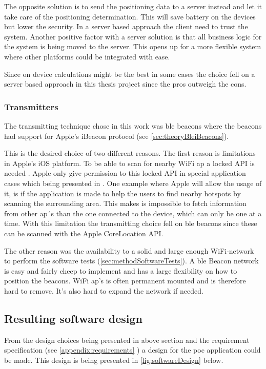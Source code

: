 \bigskip

The opposite solution is to send the positioning data to a server instead and let it take care of the positioning determination.
This will save battery on the devices but lower the security. 
In a server based approach the client need to trust the system.
Another positive factor with a server solution is that all business logic for the system is being moved to the server.
This opens up for a more flexible system where other platforms could be integrated with ease.

\bigskip

Since on device calculations might be the best in some cases the choice fell on a server based approach in this thesis project since the pros outweigh the cons.


\subsubsection{Transmitters}\label{sec:methodSoftwareDesignTransmitters}
The transmitting technique chose in this work was \acrshort{ble} beacons where the beacons had support for Apple's iBeacon protocol (see \cref{sec:theoryBleiBeacons}).

\bigskip

This is the desired choice of two different reasons.
The first reason is limitations in Apple's iOS platform.
To be able to scan for nearby WiFi \acrfull{ap} a locked API is needed \cite{NEHotspotHelperAppleDeveloper}.
Apple only give permission to this locked API in special application cases which being presented in \cite{TechnicalQA1942IOS}.
One example where Apple will allow the usage of it, is if the application is made to help the users to find nearby hotspots by scanning the surrounding area.
This makes is impossible to fetch information from other \acrshort{ap}´s than the one connected to the device, which can only be one at a time.
With this limitation the transmitting choice fell on \acrshort{ble} beacons since these can be scanned with the Apple CoreLocation API.

\bigskip

The other reason was the availability to a solid and large enough WiFi-network to perform the software tests (\cref{sec:methodSoftwareTests}).
A \acrshort{ble} Beacon network is easy and fairly cheep to implement and has a large flexibility on how to position the beacons.
WiFi \acrshort{ap}'s is often permanent mounted and is therefore hard to remove.
It's also hard to expand the network if needed.


\subsection{Resulting software design}\label{sec:methodSoftwareDesignResult}
From the design choices being presented in above section and the requirement specification (see \ref{appendix:requirements} ) a design for the \acrshort{poc} application could be made.
This design is being presented in \cref{fig:softwareDesign} below.




